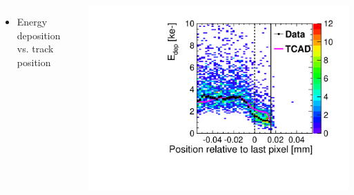 \begin{frame}
\begin{columns}[t]
    \begin{itemize}
    \item Energy deposition vs. track position
    \end{itemize}
    \centering
    \includegraphics[width=\textwidth]{../figures/ActiveEdge/28_GNDGR_Edep_TCAD_data.pdf}

  \end{columns}

\end{frame}

